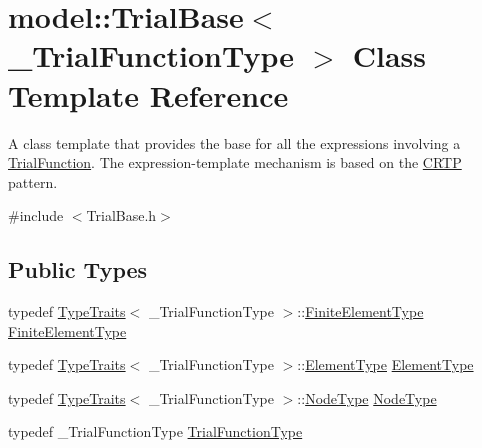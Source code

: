 \hypertarget{classmodel_1_1_trial_base}{}\section{model\+:\+:Trial\+Base$<$ \+\_\+\+Trial\+Function\+Type $>$ Class Template Reference}
\label{classmodel_1_1_trial_base}


A class template that provides the base for all the expressions involving a \hyperlink{classmodel_1_1_trial_function}{Trial\+Function}. The expression-\/template mechanism is based on the \hyperlink{classmodel_1_1_c_r_t_p}{C\+R\+T\+P} pattern.  




{\ttfamily \#include $<$Trial\+Base.\+h$>$}

\subsection*{Public Types}
\begin{DoxyCompactItemize}
\item 
typedef \hyperlink{structmodel_1_1_type_traits}{Type\+Traits}$<$ \+\_\+\+Trial\+Function\+Type $>$\+::\hyperlink{classmodel_1_1_trial_base_a45e0810798dc561fc2233fdfb9f7fa4b}{Finite\+Element\+Type} \hyperlink{classmodel_1_1_trial_base_a45e0810798dc561fc2233fdfb9f7fa4b}{Finite\+Element\+Type}
\item 
typedef \hyperlink{structmodel_1_1_type_traits}{Type\+Traits}$<$ \+\_\+\+Trial\+Function\+Type $>$\+::\hyperlink{classmodel_1_1_trial_base_a124e38df0c40239e484ce9e4e7f4f688}{Element\+Type} \hyperlink{classmodel_1_1_trial_base_a124e38df0c40239e484ce9e4e7f4f688}{Element\+Type}
\item 
typedef \hyperlink{structmodel_1_1_type_traits}{Type\+Traits}$<$ \+\_\+\+Trial\+Function\+Type $>$\+::\hyperlink{classmodel_1_1_trial_base_a97477f1b794cf8fd2f1eadd4ea88da65}{Node\+Type} \hyperlink{classmodel_1_1_trial_base_a97477f1b794cf8fd2f1eadd4ea88da65}{Node\+Type}
\item 
typedef \+\_\+\+Trial\+Function\+Type \hyperlink{classmodel_1_1_trial_base_a421d094169b46baf6aee809f3b76b4dd}{Trial\+Function\+Type}
\end{DoxyCompactItemize}
